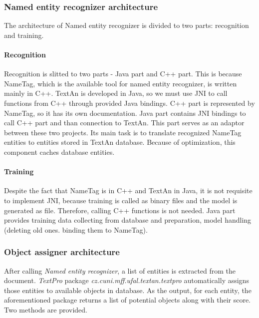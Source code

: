 \subsubsection{Named entity recognizer architecture}

The architecture of Named entity recognizer is divided to two parts: recognition and training.

\paragraph{Recognition} 
Recognition is slitted to two parts - Java part and C++ part. This is because
NameTag, which is the available tool for named entity recognizer, is written mainly in C++. 
TextAn is developed in Java, so we must use JNI to call functions from C++ through provided
Java bindings. C++ part is represented by NameTag, so it has its own documentation.
Java part contains JNI bindings to call C++ part and than connection to TextAn.
This part serves as an adaptor between these two projects. Its main task is
to translate recognized NameTag entities to entities stored in TextAn database.
Because of optimization, this component caches database entities.

\paragraph{Training}
Despite the fact that NameTag is in C++ and TextAn in Java, it is not requisite 
to implement JNI, because training is called as binary files and the model is generated
as file. Therefore, calling C++ functions is not needed. Java part provides
training data collecting from database and preparation, model handling
(deleting old ones. binding them to NameTag).

\subsubsection{Object assigner architecture}


After calling \emph{Named entity recognizer}, a list of entities is extracted from the document. \emph{TextPro}
package \emph{cz.cuni.mff.ufal.textan.textpro} automatically
assigns those entities to available objects in database. As the output, for 
each entity, the aforementioned package returns a list of potential objects along
with their score. Two methods are provided.

